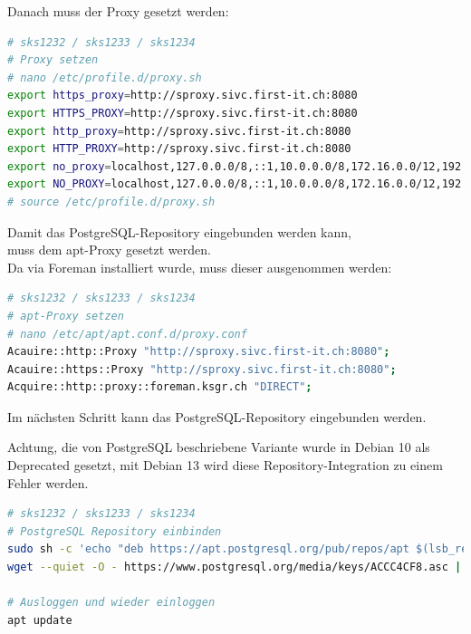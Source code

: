 Danach muss der Proxy gesetzt werden:
\lstset{style=gra_codestyle}
\begin{lstlisting}[language=bash, caption=Patroni - Proxy Settings,captionpos=b,label={lst:patroni-proxy-settings},breaklines=true]
# sks1232 / sks1233 / sks1234
# Proxy setzen
# nano /etc/profile.d/proxy.sh
export https_proxy=http://sproxy.sivc.first-it.ch:8080
export HTTPS_PROXY=http://sproxy.sivc.first-it.ch:8080
export http_proxy=http://sproxy.sivc.first-it.ch:8080
export HTTP_PROXY=http://sproxy.sivc.first-it.ch:8080
export no_proxy=localhost,127.0.0.0/8,::1,10.0.0.0/8,172.16.0.0/12,192.168.0.0/16
export NO_PROXY=localhost,127.0.0.0/8,::1,10.0.0.0/8,172.16.0.0/12,192.168.0.0/16
# source /etc/profile.d/proxy.sh
\end{lstlisting}

Damit das PostgreSQL-Repository eingebunden werden kann,\\
muss dem apt-Proxy gesetzt werden.\\
Da via \Gls{Foreman} installiert wurde, muss dieser ausgenommen werden:
\lstset{style=gra_codestyle}
\begin{lstlisting}[language=bash, caption=Patroni - apt-Proxy Settings,captionpos=b,label={lst:patroni-apt-proxy-settings},breaklines=true]
# sks1232 / sks1233 / sks1234
# apt-Proxy setzen
# nano /etc/apt/apt.conf.d/proxy.conf
Acauire::http::Proxy "http://sproxy.sivc.first-it.ch:8080";
Acauire::https::Proxy "http://sproxy.sivc.first-it.ch:8080";
Acquire::http::proxy::foreman.ksgr.ch "DIRECT";
\end{lstlisting}

Im nächsten Schritt kann das PostgreSQL-Repository eingebunden werden.
\begin{warning}
Achtung, die von PostgreSQL beschriebene Variante wurde in Debian 10 als Deprecated gesetzt,
mit Debian 13 wird diese Repository-Integration zu einem Fehler werden.
\end{warning}

\lstset{style=gra_codestyle}
\begin{lstlisting}[language=bash, caption=Patroni - PostgreSQL einbinden,captionpos=b,label={lst:patroni-include-repository},breaklines=true]
# sks1232 / sks1233 / sks1234
# PostgreSQL Repository einbinden
sudo sh -c 'echo "deb https://apt.postgresql.org/pub/repos/apt $(lsb_release -cs)-pgdg main" > /etc/apt/sources.list.d/pgdg.list'
wget --quiet -O - https://www.postgresql.org/media/keys/ACCC4CF8.asc | sudo apt-key add -

# Ausloggen und wieder einloggen
apt update
\end{lstlisting}

